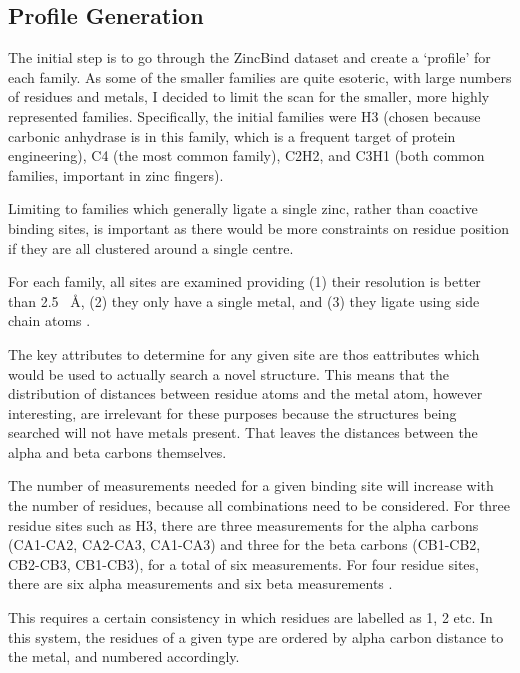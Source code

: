 \subsection{Profile Generation}

The initial step is to go through the ZincBind dataset and create a `profile' for each family. As some of the smaller families are quite esoteric, with large numbers of residues and metals, I decided to limit the scan for the smaller, more highly represented families. Specifically, the initial families were H3 (chosen because carbonic anhydrase is in this family, which is a frequent target of protein engineering), C4 (the most common family), C2H2, and C3H1 (both common families, important in zinc fingers).

Limiting to families which generally ligate a single zinc, rather than coactive binding sites, is important as there would be more constraints on residue position if they are all clustered around a single centre.

For each family, all sites are examined providing (1) their resolution is better than 2.5 ~{\AA}, (2) they only have a single metal, and (3) they ligate using side chain atoms .

The key attributes to determine for any given site are thos eattributes which would be used to actually search a novel structure. This means that the distribution of distances between residue atoms and the metal atom, however interesting, are irrelevant for these purposes because the structures being searched will not have metals present. That leaves the distances between the alpha and beta carbons themselves.

The number of measurements needed for a given binding site will increase with the number of residues, because all combinations need to be considered. For three residue sites such as H3, there are three measurements for the alpha carbons (CA1-CA2, CA2-CA3, CA1-CA3) and three for the beta carbons (CB1-CB2, CB2-CB3, CB1-CB3), for a total of six measurements. For four residue sites, there are six alpha measurements and six beta measurements .

This requires a certain consistency in which residues are labelled as 1, 2 etc. In this system, the residues of a given type are ordered by alpha carbon distance to the metal, and numbered accordingly.
